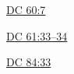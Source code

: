 		
		\begin{compactdesc}
			\item[{\hyperref[DC60-7]{DC 60:7}}]
			\item[{\hyperref[DC61-33]{DC 61:33--34}}]
			\item[{\hyperref[DC84-33]{DC 84:33}}]
		\end{compactdesc}
		
	
		
		

	


	
